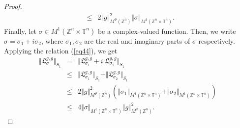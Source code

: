 \documentclass[a4paper,11pt, reqno]{amsart}
\theoremstyle{plain}
\theoremstyle{definition}
\theoremstyle{remark}
\def \Z{{\mathbb Z}}
\def \T{{\mathbb T}}
\begin{document}
\begin{proof}
\begin{eqnarray}
& \leq & 2  \Vert g \Vert^2_{M^{\Phi}(\Z^n)} \Vert \sigma \Vert_{M^1(\Z^n \times \T^n)}.
\end{eqnarray}
Finally, let $\sigma \in  M^1(\Z^n \times \T^n)$ be a complex-valued function. Then, we write $\sigma=\sigma_1+ i \sigma_2$, where $\sigma_1, \sigma_2$ are the real and imaginary parts of $\sigma$ respectively. Applying the relation (\ref{eq44}), we get
\begin{eqnarray*}
\Vert \mathfrak{L}^{g, g}_{\sigma} \Vert_{S_1}
& = & \Vert \mathfrak{L}^{g, g}_{\sigma_1}+i \; \mathfrak{L}^{g, g}_{\sigma_2} \Vert_{S_1}  \\
& \leq & \Vert \mathfrak{L}^{g, g}_{\sigma_1} \Vert_{S_1} + \Vert \mathfrak{L}^{g, g}_{\sigma_2} \Vert_{S_1} \\
&\leq & 2  \Vert g \Vert^2_{M^{\Phi}(\Z^n)} (\Vert \sigma_1 \Vert_{M^1(\Z^n \times \T^n)} + \Vert \sigma_2 \Vert_{M^1(\Z^n \times \T^n)}) \nonumber \\
& \leq & 4 \Vert \sigma \Vert_{M^1(\Z^n \times \T^n)}  \Vert g \Vert^2_{M^{\Phi}(\Z^n)}  .
\end{eqnarray*}
\end{proof}
\end{document}
